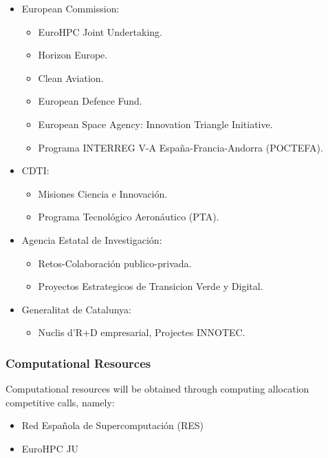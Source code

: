 \documentclass{article}
\begin{document}
\begin{itemize}[noitemsep]
\item European Commission: 
\begin{itemize}[noitemsep]
\item[·] EuroHPC Joint Undertaking.
\item[·] Horizon Europe.
\item[·] Clean Aviation.
\item[·] European Defence Fund.
\item[·] European Space Agency: Innovation Triangle Initiative.
\item[·] Programa INTERREG V-A España-Francia-Andorra (POCTEFA).
\end{itemize}
\item CDTI: 
\begin{itemize}[noitemsep]
\item[·] Misiones Ciencia e Innovación.
\item[·] Programa Tecnológico Aeronáutico (PTA). 
\end{itemize}
\item Agencia Estatal de Investigación: 
\begin{itemize}[noitemsep]
\item[·] Retos-Colaboración publico-privada.
\item[·] Proyectos Estrategicos de Transicion Verde y Digital.
\end{itemize}
\item Generalitat de Catalunya: 
\begin{itemize}[noitemsep]
\item[·] Nuclis d'R+D empresarial, Projectes INNOTEC.
\end{itemize}
\end{itemize}

\subsubsection{Computational Resources}

Computational resources will be obtained through computing allocation competitive calls, namely:

\begin{itemize}[noitemsep]
\item Red Española de Supercomputación (RES)
\item EuroHPC JU
\end{itemize}
\end{document}

